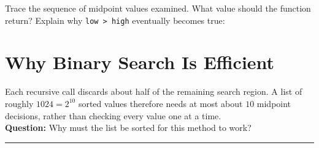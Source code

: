 \documentclass[11pt]{article}
\begin{document}
Trace the sequence of midpoint values examined.  What value should the function return?  Explain why \texttt{low > high} eventually becomes true:
\vspace{1cm}


\section{Why Binary Search Is Efficient}
Each recursive call discards about half of the remaining search region.
A list of roughly \(1024=2^{10}\) sorted values therefore needs at most
about \(10\) midpoint decisions, rather than checking every value one at
a time. \\

\textbf{Question:} Why must the list be sorted for this method to work?
\vspace{0.55cm}
\hrule
\end{document}
